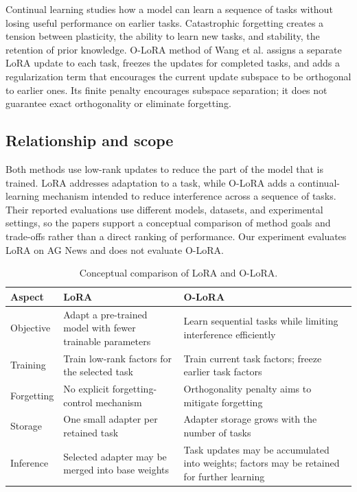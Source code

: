 Continual learning studies how a model can learn a sequence of tasks
without losing useful performance on earlier tasks. Catastrophic
forgetting creates a tension between plasticity, the ability to learn new
tasks, and stability, the retention of prior knowledge. O-LoRA method of
Wang et al. \cite{wang2023olora} assigns a separate LoRA update to each task,
freezes the updates for completed tasks, and adds a regularization term that
encourages the current update subspace to be orthogonal to earlier ones.
Its finite penalty encourages subspace separation; it does not
guarantee exact orthogonality or eliminate forgetting.

\subsection{Relationship and scope}

Both methods use low-rank updates to reduce the part of the model that is
trained. LoRA addresses adaptation to a task, while O-LoRA adds a
continual-learning mechanism intended to reduce interference across a
sequence of tasks. Their reported evaluations use different models,
datasets, and experimental settings, so the papers support a conceptual
comparison of method goals and trade-offs rather than a direct ranking of
performance. Our experiment evaluates LoRA on AG News and does not
evaluate O-LoRA.

\begin{table}[htbp]
	\centering
	\small
	\caption{Conceptual comparison of LoRA and O-LoRA.}
	\label{tab:adapter-method-comparison}
	\begin{tabularx}{\textwidth}{@{}>{\raggedright\arraybackslash}p{2.2cm}XX@{}}
		\toprule
		\textbf{Aspect} & \textbf{LoRA}                                             & \textbf{O-LoRA}                                                                            \\
		\midrule
		Objective       & Adapt a pre-trained model with fewer trainable parameters & Learn sequential tasks while limiting interference efficiently                             \\
		Training        & Train low-rank factors for the selected task              & Train current task factors; freeze earlier task factors                                    \\
		Forgetting      & No explicit forgetting-control mechanism                  & Orthogonality penalty aims to mitigate forgetting                                          \\
		Storage         & One small adapter per retained task                       & Adapter storage grows with the number of tasks                                             \\
		Inference       & Selected adapter may be merged into base weights          & Task updates may be accumulated into weights; factors may be retained for further learning \\
		\bottomrule
	\end{tabularx}
\end{table}
